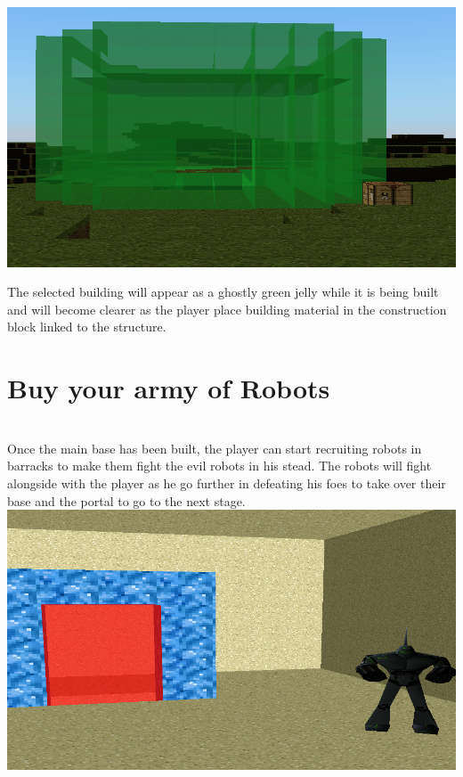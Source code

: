 \documentclass[article]{report}         %
\begin{document}
    \includegraphics[width=15cm]{images/construction_block_ghost.png}

The selected building will appear as a ghostly green jelly while it is being built and will become clearer as the player place building material in the construction block linked to the structure. \\
 

      \section{Buy your army of Robots}


  ~\\
Once the main base has been built, the player can start recruiting robots in barracks to make them fight the evil robots in his stead. The robots will fight alongside with the player as he go further in defeating his foes to take over their base and the portal to go to the next stage. \\

    \includegraphics[width=15cm]{images/desert_screen.png}
\end{document}

